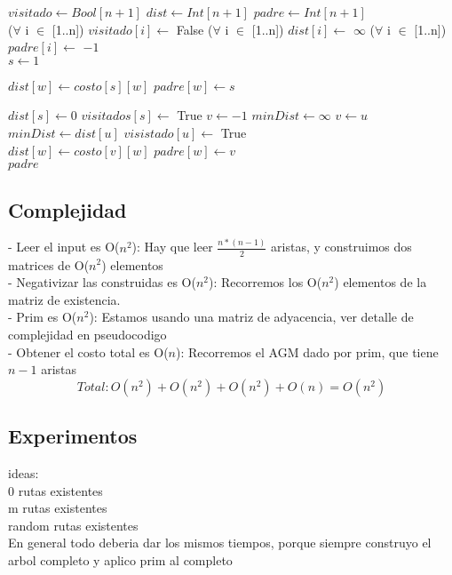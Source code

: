 \begin{algorithm}[H]
\begin{algorithmic}
	\State $visitado \gets Bool[n+1]$
	\State $dist \gets Int[n+1]$
	\State $padre \gets Int[n+1]$ \\

	\State ($\forall$ i $\in$ [1..n]) $visitado[i] \gets$ False
	\State ($\forall$ i $\in$ [1..n]) $dist[i] \gets$ $\infty$
	\State ($\forall$ i $\in$ [1..n]) $padre[i] \gets$ $-1$ \\

	\State $s \gets 1$

			\State $dist[w] \gets costo[s][w]$
			\State $padre[w] \gets s$ \\
		\EndIf
	\EndFor

	\State $dist[s] \gets 0$
	\State $visitados[s] \gets$ True
		\State $v \gets -1$
		\State $minDist \gets \infty$
				\State $v \gets u$
				\State $minDist \gets dist[u]$
			\EndIf
		\EndFor
		\State $visistado[u] \gets$ True \\

				\State $dist[w] \gets costo[v][w]$
				\State $padre[w] \gets v$ \\
			\EndIf
		\EndFor
	\EndFor
	\State \Return $padre$
\EndFunction
\end{algorithmic}
\end{algorithm}

\subsection{Complejidad}

- Leer el input es O($n^2$): Hay que leer $\frac{n*(n-1)}{2}$ aristas, y construimos dos matrices de O($n^2$) elementos \\

- Negativizar las construidas es O($n^2$): Recorremos los O($n^2$) elementos de la matriz de existencia. \\

- Prim es O($n^2$): Estamos usando una matriz de adyacencia, ver detalle de complejidad en pseudocodigo\\

- Obtener el costo total es O($n$): Recorremos el AGM dado por prim, que tiene $n-1$ aristas \\

$$Total:  O(n^2) + O(n^2) + O(n^2) + O(n) = O(n^2) $$

\subsection{Experimentos}

ideas:\\
0 rutas existentes\\
m rutas existentes\\
random rutas existentes\\

En general todo deberia dar los mismos tiempos, porque siempre construyo el arbol completo y aplico prim al completo